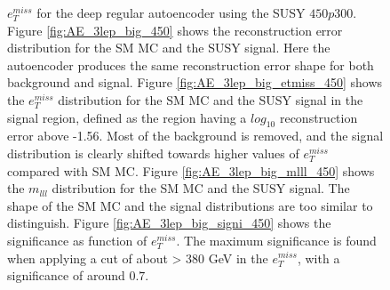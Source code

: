 \begin{figure}[!htb]
{    $e_T^{miss}$ for the deep regular autoencoder using the SUSY $450p300$. 
    Figure \ref{fig:AE_3lep_big_450} shows the reconstruction error 
    distribution for the SM MC and the SUSY signal. Here the autoencoder produces the same reconstruction error shape for both background and 
    signal. Figure \ref{fig:AE_3lep_big_etmiss_450} shows the $e_T^{miss}$ distribution for the SM MC and the SUSY signal in the signal region, 
    defined as the region having a $log_{10}$ reconstruction error above -1.56. Most of the background is removed, and the signal 
    distribution is clearly shifted towards higher values of $e_T^{miss}$ compared with SM MC. Figure \ref{fig:AE_3lep_big_mlll_450} shows the $m_{lll}$ distribution for the SM MC and the SUSY signal. 
    The shape of the SM MC and the signal distributions are too similar to distinguish. Figure \ref{fig:AE_3lep_big_signi_450} shows the significance as function of
    $e_T^{miss}$. The maximum significance is found when applying a cut of about > 380 GeV in the $e_T^{miss}$, with a significance of around $0.7$. }
    \label{fig:AE_3lep_big_rec_sig_signi_450}
\end{figure}

